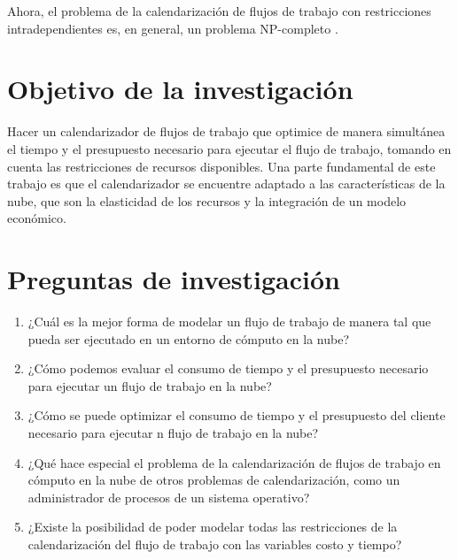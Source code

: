 \documentclass[letterpaper, 12pt]{report}
\begin{document}
Ahora, el problema de la calendarización de flujos de trabajo con restricciones intradependientes es, en general, un problema NP-completo \cite{wieczorek2009towards}. %

\section*{Objetivo de la investigación}
Hacer un calendarizador de flujos de trabajo que optimice de manera simultánea el tiempo y el presupuesto necesario para ejecutar el flujo de trabajo, tomando en cuenta las restricciones de recursos disponibles. Una parte fundamental de este trabajo es que el calendarizador se encuentre adaptado a las características de la nube, que son la elasticidad de los recursos y la integración de un modelo económico.

\section*{Preguntas de investigación}
\begin{enumerate}
\item ¿Cuál es la mejor forma de modelar un flujo de trabajo de manera tal que pueda ser ejecutado en un entorno de cómputo en la nube?
\item ¿Cómo podemos evaluar el consumo de tiempo y el presupuesto necesario para ejecutar un flujo de trabajo en la nube?
\item ¿Cómo se puede optimizar el consumo de tiempo y el presupuesto del cliente necesario para ejecutar n flujo de trabajo en la nube?
\item ¿Qué hace especial el problema de la calendarización de flujos de trabajo en cómputo en la nube de otros problemas de calendarización, como un administrador de procesos de un sistema operativo? %
\item ¿Existe la posibilidad de poder modelar todas las restricciones de la calendarización del flujo  de trabajo con las variables costo y tiempo?
\end{enumerate}

\end{document}
